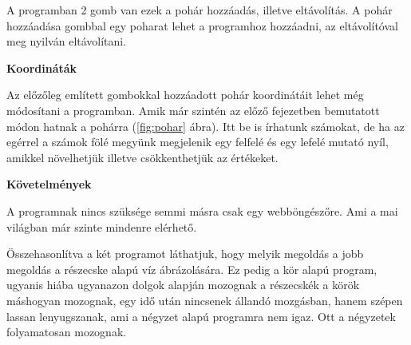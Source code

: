 A programban 2 gomb van ezek a pohár hozzáadás, illetve eltávolítás. A pohár hozzáadása gombbal egy poharat lehet a programhoz hozzáadni, az eltávolítóval meg nyilván eltávolítani. 

\textbf{Koordináták}

Az előzőleg említett gombokkal hozzáadott pohár koordinátáit lehet még módosítani a programban. Amik már szintén az előző fejezetben bemutatott módon hatnak a pohárra (\ref{fig:pohar} ábra). Itt be is írhatunk számokat, de ha az egérrel a számok fölé megyünk megjelenik egy felfelé és egy lefelé mutató nyíl, amikkel növelhetjük illetve csökkenthetjük az értékeket. 

\textbf{Követelmények}

A programnak nincs szüksége semmi másra csak egy webböngészőre. Ami a mai világban már szinte mindenre elérhető. 


Összehasonlítva a két programot láthatjuk, hogy melyik megoldás a jobb megoldás a részecske alapú víz ábrázolására. Ez pedig a kör alapú program, ugyanis hiába ugyanazon dolgok alapján mozognak a részecskék a körök máshogyan mozognak, egy idő után nincsenek állandó mozgásban, hanem szépen lassan lenyugszanak, ami a négyzet alapú programra nem igaz. Ott a négyzetek folyamatosan mozognak.

